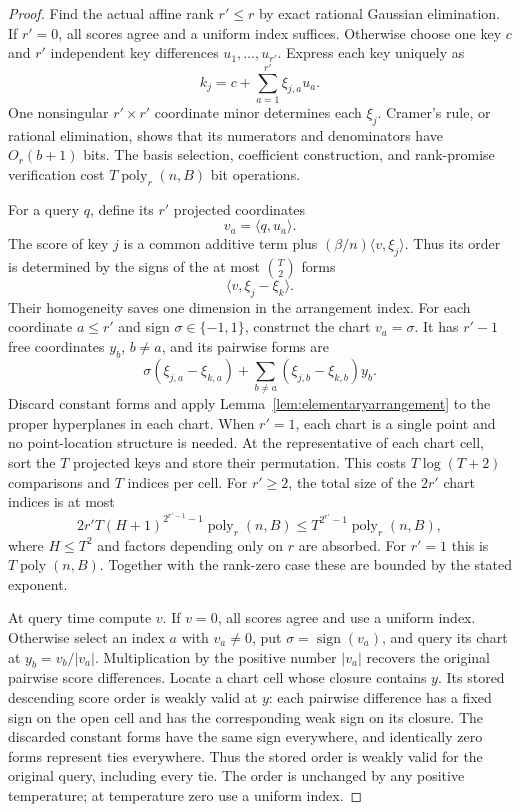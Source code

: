 \begin{proof}
Find the actual affine rank $r'\le r$ by exact rational Gaussian
elimination.  If $r'=0$, all scores agree and a uniform index
suffices.  Otherwise choose one key $c$ and $r'$ independent key
differences $u_1,\ldots,u_{r'}$.  Express each key uniquely as
\[
 k_j=c+\sum_{a=1}^{r'}\xi_{j,a}u_a.
\]
One nonsingular $r'\times r'$ coordinate minor determines each
$\xi_j$.  Cramer's rule, or rational elimination, shows that its
numerators and denominators have $O_r(b+1)$ bits.  The basis
selection, coefficient construction, and rank-promise verification
cost $T\operatorname{poly}_r(n,B)$ bit operations.

For a query $q$, define its $r'$ projected coordinates
\[
 v_a=\langle q,u_a\rangle.
\]
The score of key $j$ is a common additive term plus
$(\beta/n)\langle v,\xi_j\rangle$.  Thus its order is determined
by the signs of the at most $\binom{T}{2}$ forms
\[
 \langle v,\xi_j-\xi_k\rangle.
\]
Their homogeneity saves one dimension in the arrangement index.
For each coordinate $a\le r'$ and sign $\sigma\in\{-1,1\}$,
construct the chart $v_a=\sigma$.  It has $r'-1$ free coordinates
$y_b$, $b\ne a$, and its pairwise forms are
\[
 \sigma(\xi_{j,a}-\xi_{k,a})
 +\sum_{b\ne a}(\xi_{j,b}-\xi_{k,b})y_b.
\]
Discard constant forms and apply
Lemma~\ref{lem:elementaryarrangement} to the proper hyperplanes
in each chart.  When $r'=1$, each chart is a single point and no
point-location structure is needed.  At the representative of
each chart cell, sort the $T$ projected keys and store their
permutation.  This costs $T\log(T+2)$ comparisons and $T$ indices
per cell.  For $r'\ge2$, the total size of the $2r'$ chart indices
is at most
\[
 2r'T(H+1)^{2^{r'-1}-1}\operatorname{poly}_r(n,B)
 \le T^{2^{r'}-1}\operatorname{poly}_r(n,B),
\]
where $H\le T^2$ and factors depending only on $r$ are absorbed.
For $r'=1$ this is $T\operatorname{poly}(n,B)$.  Together with
the rank-zero case these are bounded by the stated exponent.

At query time compute $v$.  If $v=0$, all scores agree and use a
uniform index.  Otherwise select an index $a$ with $v_a\ne0$, put
$\sigma=\operatorname{sign}(v_a)$, and query its chart at
$y_b=v_b/|v_a|$.  Multiplication by the positive number $|v_a|$
recovers the original pairwise score differences.  Locate a chart
cell whose closure contains $y$.  Its stored descending score order
is weakly valid at $y$: each pairwise difference has a fixed sign
on the open cell and has the corresponding weak sign on its closure.
The discarded constant forms have the same sign everywhere, and
identically zero forms represent ties everywhere.  Thus the stored
order is weakly valid for the original query, including every tie.
The order is unchanged by any positive temperature; at temperature
zero use a uniform index.


\end{proof}
